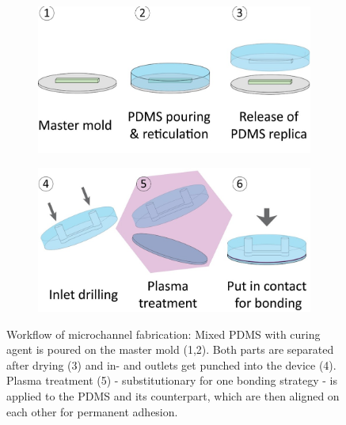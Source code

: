 \begin{figure}[tb!]
	\begin{subfigure}[t]{0.49\linewidth}
		\centering
		\includegraphics[height=0.15\textheight]{Ressourcen/IMG/mold1}
	\end{subfigure}
	\hfill
	\begin{subfigure}[t]{0.49\linewidth}
		\centering
		\includegraphics[height=0.16\textheight]{Ressourcen/IMG/mold2}
	\end{subfigure}
	\caption{Workflow of microchannel fabrication: Mixed PDMS with curing agent is poured on the master mold (1,2). Both parts are separated after drying (3) and in- and outlets get punched into the device (4). Plasma treatment (5) -  substitutionary for one bonding strategy - is applied to the PDMS and its counterpart, which are then aligned on each other for permanent adhesion.}
			\label{fig:lithograyphy:pdms}
\end{figure}

